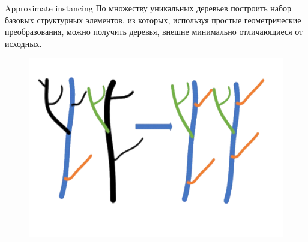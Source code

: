 \documentclass[14pt]{beamer}
\begin{document}
\begin{frame}{Approximate instancing}
По множеству уникальных деревьев построить набор базовых структурных элементов, из которых, используя простые геометрические преобразования, можно получить деревья, внешне минимально отличающиеся от исходных.
\begin{figure}[hbtp]
\includegraphics[scale=0.25]{approximate_inst.png}
\end{figure}
\end{frame}
\end{document}
